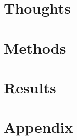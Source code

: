 \frenchspacing
\raggedbottom
{} %
\pagestyle{plain}
%


\cleardoublepage
\pagestyle{scrheadings}
\cleardoubleoddemptypage
\cleardoubleoddemptypage\part{Thoughts}
\cleardoubleoddemptypage
\cleardoubleoddemptypage
\cleardoubleoddemptypage
\cleardoubleoddemptypage\part{Methods}
\cleardoubleoddemptypage
\cleardoubleoddemptypage
\cleardoubleoddemptypage\part{Results}
\cleardoubleoddemptypage
\cleardoubleoddemptypage
\appendix
\cleardoubleoddemptypage\part{Appendix}
%

\cleardoubleoddemptypage

